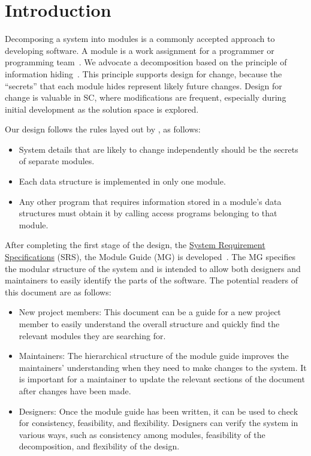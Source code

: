\documentclass[12pt, titlepage]{article}
\begin{document}
\newpage

\tableofcontents

\listoftables

\listoffigures

\newpage


\section{Introduction}

Decomposing a system into modules is a commonly accepted approach to developing
software.  A module is a work assignment for a programmer or programming
team~\citep{ParnasEtAl1984}.  We advocate a decomposition
based on the principle of information hiding~\citep{Parnas1972a}.  This
principle supports design for change, because the ``secrets'' that each module
hides represent likely future changes.  Design for change is valuable in SC,
where modifications are frequent, especially during initial development as the
solution space is explored.  

Our design follows the rules layed out by \citet{ParnasEtAl1984}, as follows:
\begin{itemize}
\item System details that are likely to change independently should be the
  secrets of separate modules.
\item Each data structure is implemented in only one module.
\item Any other program that requires information stored in a module's data
  structures must obtain it by calling access programs belonging to that module.
\end{itemize}

After completing the first stage of the design, the \href{https://github.com/SammyG7/Mac-AR/blob/main/docs/SRS/SRS.pdf}{System Requirement Specifications} (SRS), the Module Guide (MG) is developed~\citep{ParnasEtAl1984}. The MG
specifies the modular structure of the system and is intended to allow both
designers and maintainers to easily identify the parts of the software.  The
potential readers of this document are as follows:

\begin{itemize}
\item New project members: This document can be a guide for a new project member
  to easily understand the overall structure and quickly find the
  relevant modules they are searching for.
\item Maintainers: The hierarchical structure of the module guide improves the
  maintainers' understanding when they need to make changes to the system. It is
  important for a maintainer to update the relevant sections of the document
  after changes have been made.
\item Designers: Once the module guide has been written, it can be used to
  check for consistency, feasibility, and flexibility. Designers can verify the
  system in various ways, such as consistency among modules, feasibility of the
  decomposition, and flexibility of the design.
\end{itemize}
\end{document}
